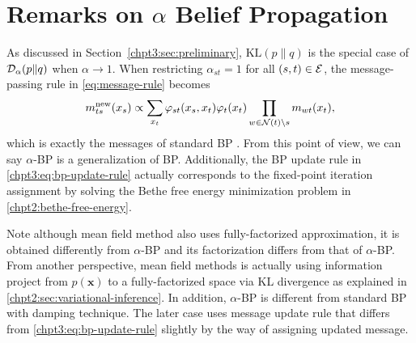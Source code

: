 \section{Remarks on $\alpha$ Belief Propagation}\label{subsec:remark}

As discussed in Section~\ref{chpt3:sec:preliminary}, $\mathrm{KL}(p\|q)$ is the special case of $\mathcal{D}_{\alpha}(p\|q)$ when $\alpha \rightarrow 1$. When restricting $\alpha_{st}=1$ for all $(s,t) \in \mathcal{E}$, the message-passing rule in \eqref{eq:message-rule} becomes
\begin{equation}\label{chpt3:eq:bp-update-rule}
  {m}^{\text{new}}_{ts}(x_s) \propto 
  \sum_{x_t} \varphi_{st}(x_s, x_t) {\varphi}_t(x_t) \prod_{w\in \mathcal{N}(t)\backslash s}m_{wt}(x_t),
\end{equation}
which is exactly the messages of standard BP \cite{Bishop:2006:PRM:1162264}. From this point of view, we can say $\alpha$-BP is a generalization of BP. Additionally, the BP update rule in \eqref{chpt3:eq:bp-update-rule} actually corresponds to the fixed-point iteration assignment by solving the Bethe free energy minimization problem in \eqref{chpt2:bethe-free-energy}.


Note although mean field method also uses fully-factorized approximation, it is obtained differently from $\alpha$-BP and its factorization differs from that of $\alpha$-BP. From another perspective, mean field methods is actually using information project from $p(\bm{x})$ to a fully-factorized space via KL divergence as explained in \autoref{chpt2:sec:variational-inference}.
In addition, 
$\alpha$-BP is different from standard BP with damping technique. The later case uses message update rule that differs from \eqref{chpt3:eq:bp-update-rule} slightly by the way of assigning  updated message. 


